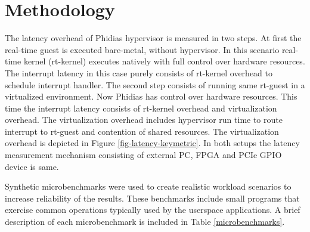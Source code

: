 \section{Methodology} \label{sec:methodology}
The latency overhead of Phidias hypervisor is measured in two steps. 
At first the real-time guest is executed bare-metal, without hypervisor. 
In this scenario real-time kernel (rt-kernel) executes natively with full control over hardware resources. 
The interrupt latency in this case purely consists of rt-kernel overhead to schedule interrupt handler.
The second step consists of running same rt-guest in a virtualized environment.
Now Phidias has control over hardware resources. 
This time the interrupt latency consists of rt-kernel overhead and 
virtualization overhead. The virtualization overhead includes hypervisor run time to route
interrupt to rt-guest and contention of shared resources. 
The virtualization overhead is depicted in Figure \ref{fig-latency-keymetric}.
In both setups the latency measurement mechanism consisting of external PC, FPGA and PCIe GPIO device is same.

Synthetic microbenchmarks were used to create realistic workload scenarios to increase reliability of the results. 
These benchmarks include small programs that exercise common operations typically used by the userspace applications.
A brief description of each microbenchmark is included in Table \ref{microbenchmarks}.

